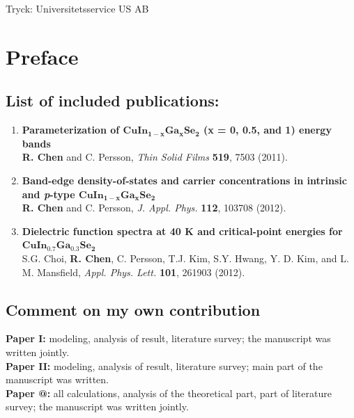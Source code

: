\documentclass[a4paper, 12pt, titlepage,oneside,drop]{kthesis}
\makeatletter
\newcommand{\Rmnum}[1]{\expandafter\@slowromancap\romannumeral #1@}
\makeatother
\begin{document}
Tryck: Universitetsservice US AB

\newpage


\begin{abstract}

\newpage

\end{abstract}

\newpage
\setcounter{page}{5}

\section*{Preface} 

\subsection*{List of included publications:}

\begin{enumerate}
\renewcommand{\labelenumi}{\Roman{enumi}}
\item{}  \textbf{Parameterization of $\mathbf {CuIn_{1-x}Ga_{x}Se_2}$ (x = 0, 0.5, and 1) energy bands}
\\\textbf{R. Chen} and C. Persson, \textit{Thin Solid Films} {\textbf {519}}, 7503 (2011).



\item{}\textbf{Band-edge density-of-states and carrier concentrations in intrinsic and \textit{p}-type $\mathbf {CuIn_{1-x}Ga_{x}Se_2}$}
\\\textbf{R. Chen} and C. Persson, \textit{J. Appl. Phys.} {\textbf {112}}, 103708 (2012).

\item{} \textbf{Dielectric function spectra at 40 K and critical-point energies for $\mathbf {CuIn_{0.7}Ga_{0.3}Se_2}$}
\\ S.G. Choi, \textbf{R. Chen}, C. Persson, T.J. Kim, S.Y. Hwang, Y. D. Kim, and L. M. Mansfield,
\textit{Appl. Phys. Lett. } {\textbf {101}}, 261903 (2012).

\end{enumerate}
\subsection*{Comment on my own contribution}

\textbf{Paper I:} modeling, analysis of result, literature survey;
the manuscript was written jointly.\\
\textbf{Paper II:} modeling, analysis of result, literature survey; main part of the manuscript was written.\\
\textbf{Paper \Rmnum{3}:} all calculations, analysis of the theoretical part, part of literature survey;
the manuscript was written jointly.\\
\end{document}
